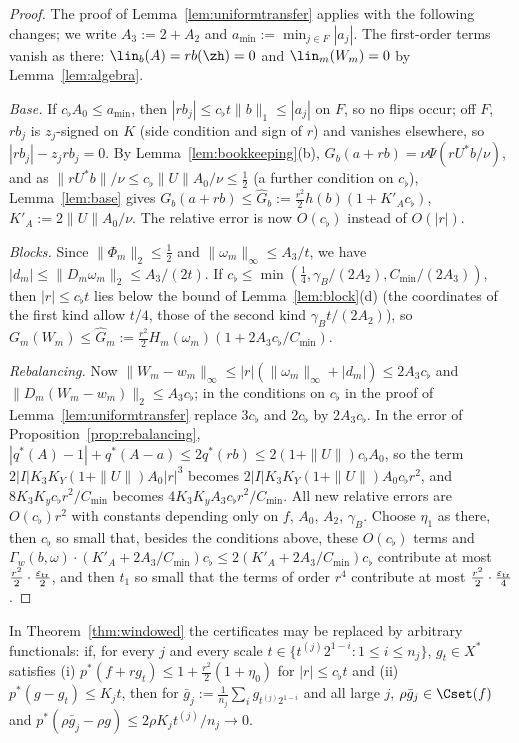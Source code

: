 \begin{proof}
The proof of Lemma~\ref{lem:uniformtransfer} applies with the following
changes; we write $A_3:=2+A_2$ and $a_{\min}:=\min_{j\in F}|a_j|$.  The
first-order terms vanish as there: $\lin_b(A)=rb(\zh)=0$ and
$\lin_m(W_m)=0$ by Lemma~\ref{lem:algebra}.

\emph{Base.}  If $c_\flat A_0\le a_{\min}$, then $|rb_j|\le c_\flat t\|b\|_1
\le|a_j|$ on $F$, so no flips occur; off $F$, $rb_j$ is $z_j$-signed on $K$
(side condition and sign of $r$) and vanishes elsewhere, so
$|rb_j|-z_jrb_j=0$.  By Lemma~\ref{lem:bookkeeping}(b),
$G_b(a+rb)=\nu\Psi(rU^*b/\nu)$, and as $\|rU^*b\|/\nu\le c_\flat\|U\|A_0/\nu
\le\frac12$ (a further condition on $c_\flat$), Lemma~\ref{lem:base} gives
$G_b(a+rb)\le\hat G_b:=\frac{r^2}2h(b)(1+K'_Ac_\flat)$, $K'_A:=2\|U\|A_0/\nu$.
The relative error is now $O(c_\flat)$ instead of $O(|r|)$.

\emph{Blocks.}  Since $\|\Phi_m\|_2\le\frac12$ and $\|\omega_m\|_\infty\le
A_3/t$, we have $|d_m|\le\|D_m\omega_m\|_2\le A_3/(2t)$.  If $c_\flat\le
\min(\frac14,\gamma_B/(2A_2),C_{\min}/(2A_3))$, then $|r|\le c_\flat t$ lies
below the bound of Lemma~\ref{lem:block}(d) (the coordinates of the first
kind allow $t/4$, those of the second kind $\gamma_Bt/(2A_2)$), so
$G_m(W_m)\le\hat G_m:=\frac{r^2}2H_m(\omega_m)(1+2A_3c_\flat/C_{\min})$.

\emph{Rebalancing.}  Now $\|W_m-w_m\|_\infty\le|r|(\|\omega_m\|_\infty+|d_m|)
\le2A_3c_\flat$ and $\|D_m(W_m-w_m)\|_2\le A_3c_\flat$; in the conditions on
$c_\flat$ in the proof of Lemma~\ref{lem:uniformtransfer} replace $3c_\flat$
and $2c_\flat$ by $2A_3c_\flat$.  In the error of
Proposition~\ref{prop:rebalancing}, $|q^*(A)-1|+q^*(A-a)\le2q^*(rb)\le
2(1+\|U\|)c_\flat A_0$, so the term
$2|I|K_3K_Y(1+\|U\|)A_0|r|^3$ becomes $2|I|K_3K_Y(1+\|U\|)A_0c_\flat r^2$,
and $8K_3K_yc_\flat r^2/C_{\min}$ becomes $4K_3K_yA_3c_\flat r^2/C_{\min}$.
All new relative errors are $O(c_\flat)r^2$ with constants depending only on
$f$, $A_0$, $A_2$, $\gamma_B$.  Choose $\eta_1$ as there, then $c_\flat$ so
small that, besides the conditions above, these $O(c_\flat)$ terms and
$\Gamma_w(b,\omega)\cdot(K'_A+2A_3/C_{\min})c_\flat\le2(K'_A+2A_3/C_{\min})
c_\flat$ contribute at most $\frac{r^2}2\cdot\frac{\varepsilon_{\rm tr}}2$,
and then $t_1$ so small that the terms of order $r^4$ contribute at most
$\frac{r^2}2\cdot\frac{\varepsilon_{\rm tr}}4$.
\end{proof}

\begin{lemma}\label{lem:avgfunctionals}
In Theorem~\ref{thm:windowed} the certificates may be replaced by
arbitrary functionals: if, for every $j$ and every scale
$t\in\{t^{(j)}2^{1-i}:1\le i\le n_j\}$, $g_t\in X^*$ satisfies
\textup{(i)} $p^*(f+rg_t)\le1+\frac{r^2}2(1+\eta_0)$ for $|r|\le c_\flat t$
and \textup{(ii)} $p^*(g-g_t)\le K_jt$, then for $\bar g_j:=\frac1{n_j}
\sum_ig_{t^{(j)}2^{1-i}}$ and all large $j$, $\rho\bar g_j\in\Cset(f)$ and
$p^*(\rho\bar g_j-\rho g)\le2\rho K_jt^{(j)}/n_j\to0$.
\end{lemma}

